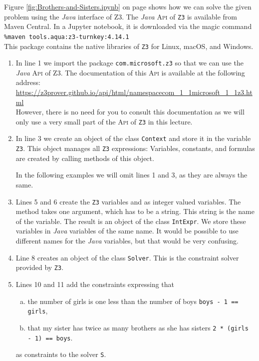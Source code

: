 \noindent
Figure \ref{fig:Brothers-and-Sisters.ipynb} on page \pageref{fig:Brothers-and-Sisters.ipynb} shows how we can
solve the given problem using the \textsl{Java}
interface of Z3.  The \textsl{Java} \textsc{Api} of \texttt{Z3} is available from Maven Central.  In a Jupyter
notebook, it is downloaded via the magic command
\\[0.2cm]
\hspace*{1.3cm}
\texttt{\%maven tools.aqua:z3-turnkey:4.14.1}
\\[0.2cm]
This package contains the native libraries of \texttt{Z3} for Linux, macOS, and Windows.
\begin{enumerate}
\item In line 1 we import the package \texttt{com.microsoft.z3} so that we can use the \textsl{Java}
      \textsc{Api} of Z3.  The documentation of this \textsc{Api} is available at the following address:
      \\[0.2cm]
      \hspace*{1.0cm}
      \url{https://z3prover.github.io/api/html/namespacecom_1_1microsoft_1_1z3.html}
      \\[0.2cm]
      However, there is no need for you to consult this documentation as we will only use a very small part of
      the \textsc{Api} of \texttt{Z3} in this lecture.
\item In line 3 we create an object of the class \texttt{Context} and store it in the variable \texttt{Z3}.
      This object manages all \texttt{Z3} expressions: Variables, constants, and formulas are created by
      calling methods of this object.
      
      In the following examples we will omit lines 1 and 3, as they are always the same.
\item Lines 5 and 6 create the \texttt{Z3} variables  and  as integer valued variables.
      The method  takes one argument, which has to be a string.  This string is the name of the
      variable.  The result is an object of the class \texttt{IntExpr}.  We store these variables in
      \textsl{Java} variables of the same name.  It would be possible to use different names for the
      \textsl{Java} variables, but that would be very confusing.
\item Line 8 creates an object of the class \texttt{Solver}.  This is the constraint solver provided by
      \texttt{Z3}.
      \item Lines 10 and 11 add the constraints expressing that
      \begin{enumerate}[(a)]
      \item the number of girls is one less than the number of boys \texttt{boys - 1 == girls},
      \item that my sister has twice as many brothers as she has sisters \texttt{2 * (girls - 1) == boys}.
      \end{enumerate}
      as constraints to the solver \texttt{S}.


\end{enumerate}
